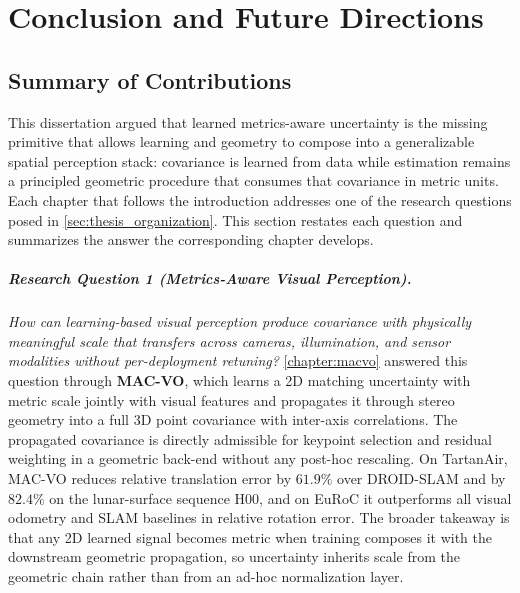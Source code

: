 \chapter{Conclusion and Future Directions} \label{chapter:conclusion}

\section{Summary of Contributions}

This dissertation argued that learned metrics-aware uncertainty is the missing primitive that allows learning and geometry to compose into a generalizable spatial perception stack: covariance is learned from data while estimation remains a principled geometric procedure that consumes that covariance in metric units.
Each chapter that follows the introduction addresses one of the research questions posed in \cref{sec:thesis_organization}.
This section restates each question and summarizes the answer the corresponding chapter develops.

\paragraph{Research Question 1 (Metrics-Aware Visual Perception).}
\textit{How can learning-based visual perception produce covariance with physically meaningful scale that transfers across cameras, illumination, and sensor modalities without per-deployment retuning?}
\cref{chapter:macvo} answered this question through \textbf{MAC-VO}, which learns a 2D matching uncertainty with metric scale jointly with visual features and propagates it through stereo geometry into a full 3D point covariance with inter-axis correlations.
The propagated covariance is directly admissible for keypoint selection and residual weighting in a geometric back-end without any post-hoc rescaling.
On TartanAir, MAC-VO reduces relative translation error by $61.9\%$ over DROID-SLAM and by $82.4\%$ on the lunar-surface sequence H00, and on EuRoC it outperforms all visual odometry and SLAM baselines in relative rotation error.
The broader takeaway is that any 2D learned signal becomes metric when training composes it with the downstream geometric propagation, so uncertainty inherits scale from the geometric chain rather than from an ad-hoc normalization layer.

